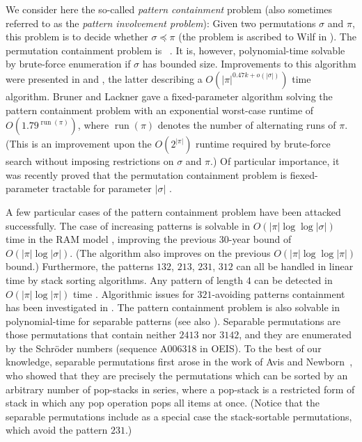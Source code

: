 \documentclass[a4paper]{llncs}
\DeclareMathOperator{\RUN}{run}
\newcounter{num}
\begin{document}
	We consider here the so-called \emph{pattern containment} problem
	(also sometimes referred to as the \emph{pattern involvement problem}):
	Given two permutations $\sigma$ and $\pi$, this problem is to decide whether
	$\sigma \preceq \pi$ (the problem is ascribed to Wilf in \cite{Bose:Buss:Lubiw:1998}).
	The permutation containment problem is \NPhard~\cite{Bose:Buss:Lubiw:1998}.
	It is, however, polynomial-time solvable by brute-force enumeration
	if $\sigma$ has bounded size.
	Improvements to this algorithm were presented in
	\cite{Albert:Aldred:Atkinson:Holton:ISAAC:2001} and
	\cite{Ahal:Rabinovich:2008},
	the latter describing a $O(|\pi|^{0.47k+o(|\sigma| )})$ time algorithm.
	Bruner and Lackner \cite{Bruner:Lackner:SWAT:2012}
	gave a fixed-parameter algorithm solving the pattern containment problem with
	an exponential worst-case runtime of $O(1.79^{\RUN(\pi)})$,
	where $\RUN(\pi)$ denotes the number of alternating runs of $\pi$.
	(This is an improvement upon the $O(2^{|\pi|})$ runtime required by
	brute-force search without imposing restrictions on $\sigma$ and $\pi$.)
	Of particular importance, it was recently proved that
	the permutation containment problem is fiexed-parameter tractable for
	parameter $|\sigma|$
	\cite{Guillemot:Marx:SODA:2014}.

	A few particular cases of the pattern containment problem have been attacked successfully.
	The case of increasing patterns is solvable in
	$O(|\pi| \log \log |\sigma|)$ time in the RAM model \cite{Crochemore:Porat:2010},
	improving the previous 30-year bound of $O(|\pi| \log |\sigma|)$.
	(The algorithm also improves on the previous
	$O(|\pi| \log \log |\pi|)$ bound.)
	Furthermore, the patterns $132$, $213$, $231$, $312$ can all be handled in linear time
	by stack sorting algorithms.
	Any pattern of length $4$ can be detected in $O(|\pi| \log |\pi|)$ time
	\cite{Albert:Aldred:Atkinson:Holton:ISAAC:2001}.
	Algorithmic issues for $321$-avoiding patterns containment has been investigated in
	\cite{Guillemot:Vialette:ISAAC:2009}.
	The pattern containment problem is also solvable in
	polynomial-time for separable patterns \cite{Ibarra:1997}
	(see also \cite{Bose:Buss:Lubiw:1998}).
	Separable permutations are those permutations that contain neither
	$2413$ nor $3142$, and they are enumerated by the Schröder numbers
	(sequence A006318 in OEIS).
	To the best of our knowledge,
	separable permutations first arose in the work of
	Avis and Newborn~\cite{Avis:Newborn:1981},
	who showed that they are precisely the permutations which can be sorted by an
	arbitrary number of pop-stacks in series,
	where a pop-stack is a restricted form of stack in which any pop operation
	pops all items at once.
	(Notice that the separable permutations include as a special case the
	stack-sortable permutations, which avoid the pattern $231$.)
\end{document}
